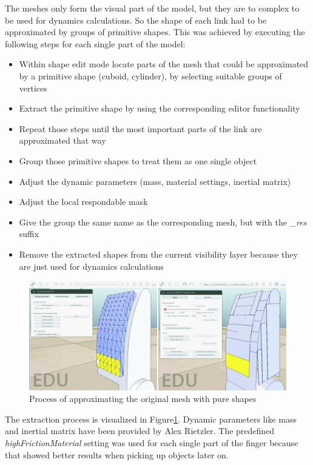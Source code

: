 The meshes only form the visual part of the model, but they are to complex to be used for dynamics calculations. So the shape of each link had to be approximated by groups of primitive shapes. This was achieved by executing the following steps for each single part of the model:
\begin{itemize}
\item
Within shape edit mode locate parts of the mesh that could be approximated by a primitive shape (cuboid, cylinder), by selecting suitable groups of vertices
\item
Extract the primitive shape by using the corresponding editor functionality
\item
Repeat those steps until the most important parts of the link are approximated that way
\item
Group those primitive shapes to treat them as one single object
\item
Adjust the dynamic parameters (mass, material settings, inertial matrix)
\item
Adjust the local respondable mask
\item
Give the group the same name as the corresponding mesh, but with the \emph{\_res} suffix
\item
Remove the extracted shapes from the current visibility layer because they are just used for dynamics calculations
\end{itemize}
\begin{figure}[ht]
	\centering
  	\includegraphics[width=1.0\textwidth]{images/extract_pure_shapes.jpg}
	\caption{Process of approximating the original mesh with pure shapes}
	\label{fig:ex_pure_shape}
\end{figure}
The extraction process is visualized in Figure\ref{fig:ex_pure_shape}. Dynamic parameters like mass and inertial matrix have been provided by Alex Rietzler. The predefined \emph{highFrictionMaterial} setting was used for each single part of the finger because that showed better results when picking up objects later on.\\

